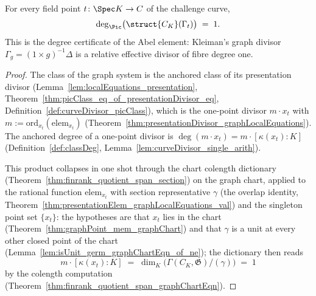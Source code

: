\begin{theorem}
  \label{thm:classDeg_graphPicClass}
  \leanok
  For every field point \(t \colon \Spec K \to C\) of the challenge curve,
  \[
    \deg_{\Pic}\bigl(\struct{C_K}(\Gamma_t)\bigr) \;=\; 1 .
  \]
  This is the degree certificate of the Abel element: Kleiman's graph divisor
  \(\Gamma_g = (1 \times g)^{-1}\Delta\) is a relative effective divisor of fibre degree
  one.
\end{theorem}
\begin{proof}
  \leanok
  The class of the graph system is the anchored class of its presentation divisor
  (Lemma~\ref{lem:localEquations_presentation},
  Theorem~\ref{thm:picClass_eq_of_presentationDivisor_eq},
  Definition~\ref{def:curveDivisor_picClass}), which is the one-point divisor
  \(m \cdot x_t\) with \(m := \mathrm{ord}_{x_t}(\mathrm{elem}_{x_t})\)
  (Theorem~\ref{thm:presentationDivisor_graphLocalEquations}). The anchored degree of a
  one-point divisor is \(\deg(m \cdot x_t) = m \cdot [\kappa(x_t) : K]\)
  (Definition~\ref{def:classDeg}, Lemma~\ref{lem:curveDivisor_single_arith}).

  This product collapses in one shot through the chart colength dictionary
  (Theorem~\ref{thm:finrank_quotient_span_section}) on the graph chart, applied to the
  rational function \(\mathrm{elem}_{x_t}\) with section representative \(\gamma\)
  (the overlap identity, Theorem~\ref{thm:presentationElem_graphLocalEquations_val}) and
  the singleton point set \(\{x_t\}\): the hypotheses are that \(x_t\) lies in the chart
  (Theorem~\ref{thm:graphPoint_mem_graphChart}) and that \(\gamma\) is a unit at every
  other closed point of the chart (Lemma~\ref{lem:isUnit_germ_graphChartEqn_of_ne}); the
  dictionary then reads
  \[
    m \cdot [\kappa(x_t):K]
      \;=\; \dim_K\bigl(\Gamma(C_K, \mathfrak G)/(\gamma)\bigr)
      \;=\; 1
  \]
  by the colength computation
  (Theorem~\ref{thm:finrank_quotient_span_graphChartEqn}).
\end{proof}

